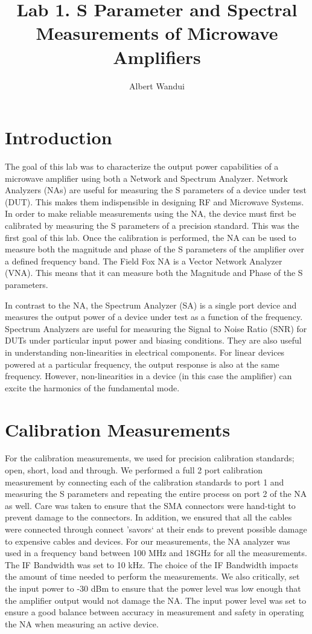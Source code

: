 \documentclass[twocolumn, aps, apl]{revtex4-1}
\begin{document}
\title{Lab 1. S Parameter and Spectral Measurements of Microwave Amplifiers}
\author{Albert Wandui}
\maketitle

\section*{Introduction}
The goal of this lab was to characterize the output power capabilities of a microwave amplifier using both a Network and Spectrum Analyzer. Network Analyzers (NAs) are useful for measuring the S parameters of a device under test (DUT). This makes them indispensible in designing RF and Microwave Systems. In order to make reliable measurements using the NA, the device must first be calibrated by measuring the S parameters of a precision standard. This was the first goal of this lab. Once the calibration is performed, the NA can be used to measure both the magnitude and phase of the S parameters of the amplifier over a defined frequency band. The Field Fox NA is a Vector Network Analyzer (VNA). This means that it can measure both the Magnitude and Phase of the S parameters.

In contrast to the NA, the Spectrum Analyzer (SA) is a single port device and measures the output power of a device under test as a function of the frequency. Spectrum Analyzers are useful for measuring the Signal to Noise Ratio (SNR) for DUTs under particular input power and biasing conditions. They are also useful in understanding non-linearities in electrical components. For linear devices powered at a particular frequency, the output response is also at the same frequency. However, non-linearities in a device (in this case the amplifier) can excite the harmonics of the fundamental mode. 


\section*{Calibration Measurements}
For the calibration measurements, we used for precision calibration standards; open, short, load and through. We performed a full 2 port calibration measurement by connecting each of the calibration standards to port 1 and measuring the S parameters and repeating the entire process on port 2 of the NA as well. Care was taken to ensure that the SMA connectors were hand-tight to prevent damage to the connectors. In addition, we ensured that all the cables were connected through connect 'savors` at their ends to prevent possible damage to expensive cables and devices. For our measurements, the NA analyzer was used in a frequency band between 100 MHz and 18GHz for all the measurements. The IF Bandwidth was set to 10 kHz. The choice of the IF Bandwidth impacts the amount of time needed to perform the measurements. We also critically, set the input power to -30 dBm to ensure that the power level was low enough that the amplifier output would not damage the NA. The input power level was set to ensure a good balance between accuracy in measurement and safety in operating the NA when measuring an active device. 
\end{document}

